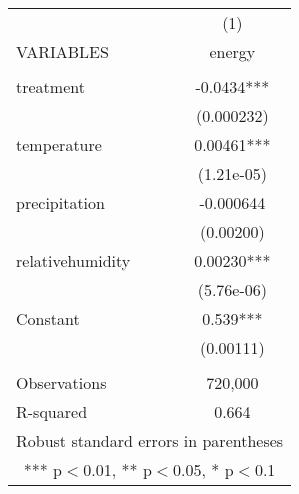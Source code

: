\documentclass[]{article}
\begin{document}
\begin{tabular}{lc} \hline
 & (1) \\
VARIABLES & energy \\ \hline
 &  \\
treatment & -0.0434*** \\
 & (0.000232) \\
temperature & 0.00461*** \\
 & (1.21e-05) \\
precipitation & -0.000644 \\
 & (0.00200) \\
relativehumidity & 0.00230*** \\
 & (5.76e-06) \\
Constant & 0.539*** \\
 & (0.00111) \\
 &  \\
Observations & 720,000 \\
 R-squared & 0.664 \\ \hline
\multicolumn{2}{c}{ Robust standard errors in parentheses} \\
\multicolumn{2}{c}{ *** p$<$0.01, ** p$<$0.05, * p$<$0.1} \\
\end{tabular}
\end{document}
